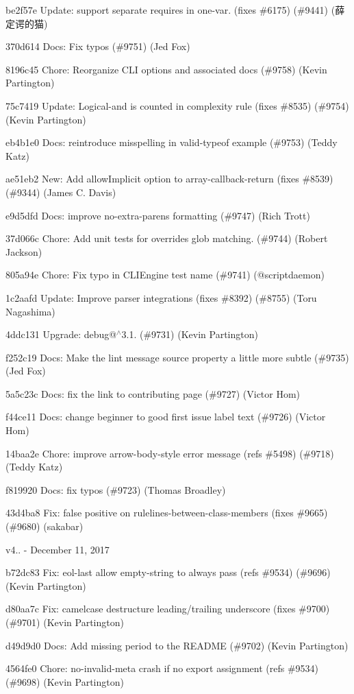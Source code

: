 \begin{DoxyItemize}
\item be2f57e Update\+: support separate requires in one-\/var. (fixes \#6175) (\#9441) (薛定谔的猫)
\item 370d614 Docs\+: Fix typos (\#9751) (Jed Fox)
\item 8196c45 Chore\+: Reorganize C\+LI options and associated docs (\#9758) (Kevin Partington)
\item 75c7419 Update\+: Logical-\/and is counted in {\ttfamily complexity} rule (fixes \#8535) (\#9754) (Kevin Partington)
\item eb4b1e0 Docs\+: reintroduce misspelling in {\ttfamily valid-\/typeof} example (\#9753) (Teddy Katz)
\item ae51eb2 New\+: Add allow\+Implicit option to array-\/callback-\/return (fixes \#8539) (\#9344) (James C. Davis)
\item e9d5dfd Docs\+: improve no-\/extra-\/parens formatting (\#9747) (Rich Trott)
\item 37d066c Chore\+: Add unit tests for overrides glob matching. (\#9744) (Robert Jackson)
\item 805a94e Chore\+: Fix typo in C\+L\+I\+Engine test name (\#9741) (@scriptdaemon)
\item 1c2aafd Update\+: Improve parser integrations (fixes \#8392) (\#8755) (Toru Nagashima)
\item 4ddc131 Upgrade\+: debug@$^\wedge$3.1. (\#9731) (Kevin Partington)
\item f252c19 Docs\+: Make the lint message {\ttfamily source} property a little more subtle (\#9735) (Jed Fox)
\item 5a5c23c Docs\+: fix the link to contributing page (\#9727) (Victor Hom)
\item f44ce11 Docs\+: change beginner to good first issue label text (\#9726) (Victor Hom)
\item 14baa2e Chore\+: improve arrow-\/body-\/style error message (refs \#5498) (\#9718) (Teddy Katz)
\item f819920 Docs\+: fix typos (\#9723) (Thomas Broadley)
\item 43d4ba8 Fix\+: false positive on rule{\ttfamily lines-\/between-\/class-\/members} (fixes \#9665) (\#9680) (sakabar)
\end{DoxyItemize}

v4.. -\/ December 11, 2017


\begin{DoxyItemize}
\item b72dc83 Fix\+: eol-\/last allow empty-\/string to always pass (refs \#9534) (\#9696) (Kevin Partington)
\item d80aa7c Fix\+: camelcase destructure leading/trailing underscore (fixes \#9700) (\#9701) (Kevin Partington)
\item d49d9d0 Docs\+: Add missing period to the R\+E\+A\+D\+ME (\#9702) (Kevin Partington)
\item 4564fe0 Chore\+: no-\/invalid-\/meta crash if no export assignment (refs \#9534) (\#9698) (Kevin Partington)
\end{DoxyItemize}

